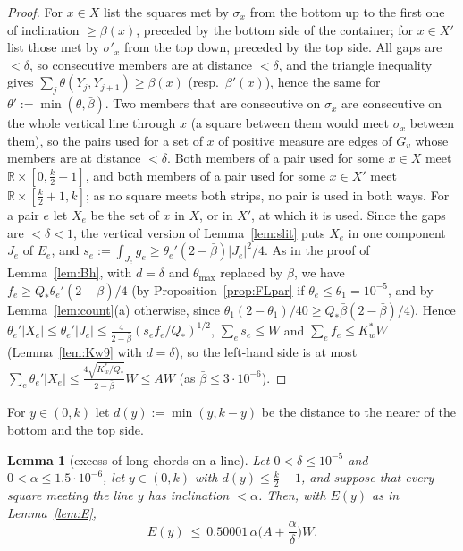 \documentclass[11pt]{amsart}
\newtheorem{lemma}[theorem]{Lemma}
\theoremstyle{definition}
\theoremstyle{remark}
\newcommand{\R}{\mathbb{R}}
\begin{document}
\begin{proof}
For $x\in X$ list the squares met by $\sigma_x$ from the bottom up to the first one of inclination $\ge\beta(x)$, preceded by the
bottom side of the container; for $x\in X'$ list those met by $\sigma'_x$ from the top down, preceded by the top side. All gaps
are $<\delta$, so consecutive members are at distance $<\delta$, and the triangle inequality gives
$\sum_j\theta(Y_j,Y_{j+1})\ge\beta(x)$ (resp.\ $\beta'(x)$), hence the same for $\theta':=\min(\theta,\bar\beta)$. Two members that are
consecutive on $\sigma_x$ are consecutive on the whole vertical line through $x$ (a square between them would meet $\sigma_x$
between them), so the pairs used for a set of $x$ of positive measure are edges of $G_v$ whose members are at distance $<\delta$.
Both members of a pair used for some $x\in X$ meet $\R\times[0,\frac k2-1]$, and both members of a pair used for some $x\in X'$ meet
$\R\times[\frac k2+1,k]$; as no square meets both strips, no pair is used in both ways. For a pair $e$ let $X_e$ be the set of
$x$ in $X$, or in $X'$, at which it is used. Since the gaps are $<\delta<1$, the vertical version of Lemma~\ref{lem:slit} puts $X_e$
in one component $J_e$ of $E_e$, and $s_e:=\int_{J_e}g_e\ge\theta_e'(2-\bar\beta)|J_e|^2/4$. As in the proof of Lemma~\ref{lem:Bh}, with
$d=\delta$ and $\theta_{\max}$ replaced by $\bar\beta$, we have $f_e\ge Q_*\theta_e'(2-\bar\beta)/4$ (by Proposition~\ref{prop:FLpar} if
$\theta_e\le\theta_1=10^{-5}$, and by Lemma~\ref{lem:count}(a) otherwise, since $\theta_1(2-\theta_1)/40\ge Q_*\bar\beta(2-\bar\beta)/4$). Hence
$\theta_e'|X_e|\le\theta_e'|J_e|\le\frac4{2-\bar\beta}(s_ef_e/Q_*)^{1/2}$, $\sum_es_e\le W$ and $\sum_ef_e\le K_w^*W$ (Lemma~\ref{lem:Kw9} with $d=\delta$), so the
left-hand side is at most $\sum_e\theta_e'|X_e|\le\frac{4\sqrt{K_w^*/Q_*}}{2-\bar\beta}W\le AW$ (as $\bar\beta\le3\cdot10^{-6}$).
\end{proof}

For $y\in(0,k)$ let $d(y):=\min(y,k-y)$ be the distance to the nearer of the bottom and the top side.

\begin{lemma}[excess of long chords on a line]\label{lem:Eline}
Let $0<\delta\le10^{-5}$ and $0<\alpha\le1.5\cdot10^{-6}$, let $y\in(0,k)$ with $d(y)\le\frac k2-1$, and suppose that every square
meeting the line $y$ has inclination $<\alpha$. Then, with $E(y)$ as in Lemma~\ref{lem:E},
\[
E(y)\ \le\ 0.50001\,\alpha\Big(A+\frac\alpha\delta\Big)W .
\]
\end{lemma}
\end{document}
